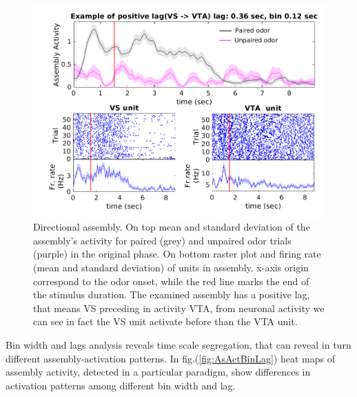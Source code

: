 \begin{figure}
    \centering
    \includegraphics[scale=0.4]{figures/1_21Lastrev1Pru_An4Poster2.png}
    \caption{Directional assembly. On top mean and standard deviation of the assembly's activity for paired (grey) and unpaired odor trials (purple) in the original phase. On bottom raster plot and firing rate (mean and standard deviation) of units in assembly. x-axis origin correspond to the odor onset, while the red line marks the end of the stimulus duration. The examined assembly has a positive lag, that means VS preceding in activity VTA, from neuronal activity we can see in fact the VS unit activate before than the VTA unit.}
    \label{fig:directional_assembly}
\end{figure}
Bin width and lags analysis reveals time scale segregation, that can reveal in turn different assembly-activation patterns. In fig.(\ref{fig:AsActBinLag}) heat maps of assembly activity, detected in a particular paradigm, show differences in activation patterns among different bin width and lag. %

